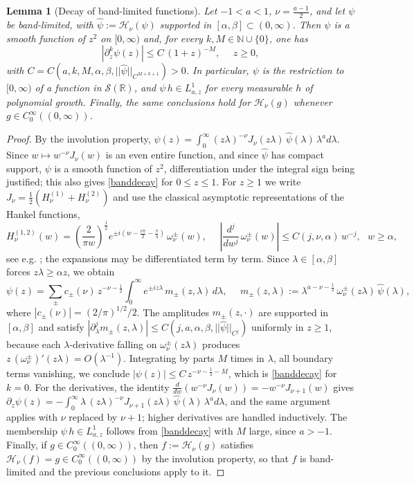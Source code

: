 \documentclass[11pt,letter]{amsart}
\def \N {\mathbb{N}}
\def \R {\mathbb{R}}
\newcommand{\p}{\partial}
\newcommand{\la}{\lambda}
\numberwithin{equation}{section}
\newtheorem{lemma}[theorem]{Lemma}
\numberwithin{equation}{section}
\begin{document}
\begin{lemma}[Decay of band-limited functions]\label{L:band}
Let $-1<a<1$, $\nu = \frac{a-1}2$, and let $\psi$ be band-limited, with $\hat\psi := \mathcal H_\nu(\psi)$ supported in $[\alpha,\beta]\subset(0,\infty)$. Then $\psi$ is a smooth function of $z^2$ on $[0,\infty)$ and, for every $k, M\in \N\cup\{0\}$, one has
\begin{equation}\label{banddecay}
|\p^k_z\psi(z)| \le C\, (1+z)^{-M},\ \ \ \ \ \ z\ge 0,
\end{equation}
with $C = C(a,k,M,\alpha,\beta,||\hat\psi||_{C^{M+k+1}})>0$. In particular, $\psi$ is the restriction to $[0,\infty)$ of a function in $\mathscr S(\R)$, and $\psi\, h\in L^1_{a,z}$ for every measurable $h$ of polynomial growth. Finally, the same conclusions hold for $\mathcal H_\nu(g)$ whenever $g\in C_0^\infty((0,\infty))$.
\end{lemma}

\begin{proof}
By the involution property, $\psi(z) = \int_0^\infty (z\la)^{-\nu}J_\nu(z\la)\, \hat\psi(\la)\, \la^a d\la$. Since $w\mapsto w^{-\nu}J_\nu(w)$ is an even entire function, and since $\hat\psi$ has compact support, $\psi$ is a smooth function of $z^2$, differentiation under the integral sign being justified; this also gives \eqref{banddecay} for $0\le z\le 1$. For $z\ge 1$ we write $J_\nu = \frac12 \left(H^{(1)}_\nu + H^{(2)}_\nu\right)$ and use the classical asymptotic representations of the Hankel functions,
\[
H^{(1,2)}_\nu(w) = \left(\frac{2}{\pi w}\right)^{\frac 12} e^{\pm i \left(w - \frac{\nu\pi}2 - \frac{\pi}4\right)}\, \omega^{\pm}_\nu(w),\ \ \ \ \ \ \left|\frac{d^j}{dw^j}\,\omega^{\pm}_\nu(w)\right| \le C(j,\nu,\alpha)\, w^{-j},\ \ \ w\ge \alpha,
\]
see e.g. \cite[8.451]{GR}; the expansions may be differentiated term by term. Since $\la\in [\alpha,\beta]$ forces $z\la\ge \alpha z$, we obtain
\[
\psi(z) = \sum_{\pm} c_{\pm}(\nu)\, z^{-\nu-\frac12} \int_0^\infty e^{\pm i z\la}\, m_\pm(z,\la)\, d\la,\ \ \ \ \ \ m_\pm(z,\la) := \la^{a-\nu-\frac 12}\, \omega^{\pm}_\nu(z\la)\, \hat\psi(\la),
\]
where $|c_\pm(\nu)| = (2/\pi)^{1/2}/2$. The amplitudes $m_\pm(z,\cdot)$ are supported in $[\alpha,\beta]$ and satisfy $|\p^j_\la m_\pm(z,\la)|\le C(j,a,\alpha,\beta,||\hat\psi||_{C^j})$ uniformly in $z\ge1$, because each $\la$-derivative falling on $\omega^\pm_\nu(z\la)$ produces $z\, (\omega^\pm_\nu)'(z\la) = O(\la^{-1})$. Integrating by parts $M$ times in $\la$, all boundary terms vanishing, we conclude $|\psi(z)|\le C\, z^{-\nu-\frac12-M}$, which is \eqref{banddecay} for $k=0$. For the derivatives, the identity $\frac{d}{dw}\left(w^{-\nu}J_\nu(w)\right) = - w^{-\nu}J_{\nu+1}(w)$ gives $\p_z\psi(z) = -\int_0^\infty \la\, (z\la)^{-\nu}J_{\nu+1}(z\la)\, \hat\psi(\la)\,\la^ad\la$, and the same argument applies with $\nu$ replaced by $\nu+1$; higher derivatives are handled inductively. The membership $\psi\, h \in L^1_{a,z}$ follows from \eqref{banddecay} with $M$ large, since $a>-1$. Finally, if $g\in C_0^\infty((0,\infty))$, then $f:= \mathcal H_\nu(g)$ satisfies $\mathcal H_\nu(f) = g\in C_0^\infty((0,\infty))$ by the involution property, so that $f$ is band-limited and the previous conclusions apply to it.

\end{proof}
\end{document}
